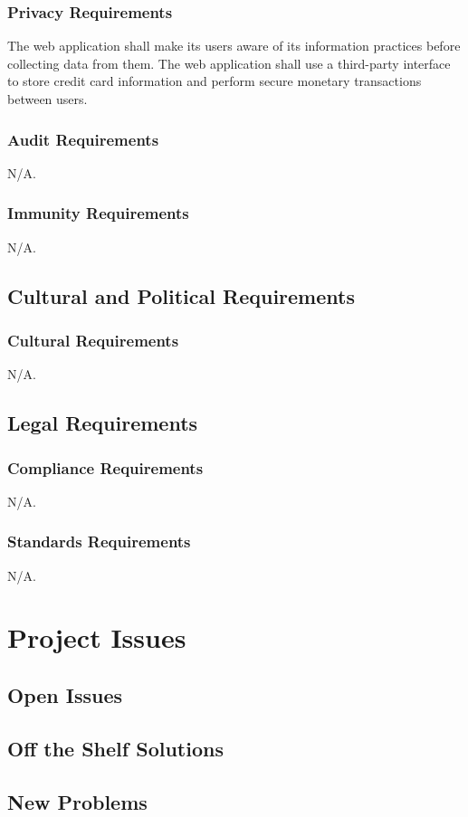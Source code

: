 \documentclass[12pt, titlepage]{article}
\begin{document}
{\subsubsection{Privacy Requirements}
The web application shall make its users aware of its information practices before collecting data from them. The web application shall use a third-party interface to store credit card information and perform secure monetary transactions between users.
\subsubsection{Audit Requirements}
N/A.
\subsubsection{Immunity Requirements}
N/A.
\subsection{Cultural and Political Requirements}
\subsubsection{Cultural Requirements}
N/A.
\subsection{Legal Requirements}
\subsubsection{Compliance Requirements}
N/A.
\subsubsection{Standards Requirements}
N/A.

\section{Project Issues}
\subsection{Open Issues}
\subsection{Off the Shelf Solutions}
\subsection{New Problems}
}
\end{document}

